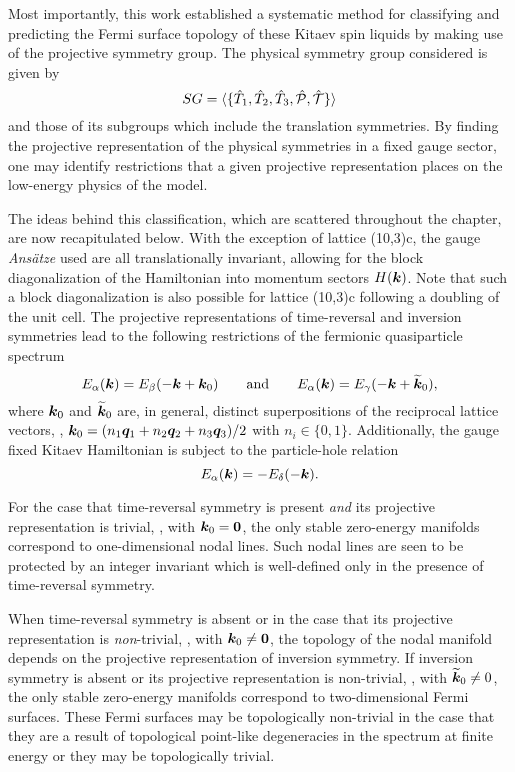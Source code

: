 Most importantly, this work established a systematic method for classifying and predicting the Fermi surface topology of these Kitaev spin liquids by making use of the projective symmetry group.
The physical symmetry group considered is given by
%
\begin{equation}
SG = \langle \{ \hat{T}_1, \hat{T}_2, \hat{T}_3, \hat{\mathcal{P}}, \hat{\mathcal{T}} \} \rangle
\end{equation}
%
and those of its subgroups which include the translation symmetries.
By finding the projective representation of the physical symmetries in a fixed gauge sector, one may identify restrictions that a given projective representation places on the low-energy physics of the model.

The ideas behind this classification, which are scattered throughout the chapter, are now recapitulated below.
With the exception of lattice (10,3)c, the gauge \textit{Ans\"atze} used are all translationally invariant, allowing for the block diagonalization of the Hamiltonian into momentum sectors $H(\bm{k})$.
Note that such a block diagonalization is also possible for lattice (10,3)c following a doubling of the unit cell.
The projective representations of time-reversal and inversion symmetries lead to the following restrictions of the fermionic quasiparticle spectrum
%
\begin{equation}
	E_{\alpha}(\bm{k}) = E_{\beta}(-\bm{k} + \bm{k}_0) \qquad {\rm and} \qquad E_{\alpha}(\bm{k}) = E_{\gamma}(-\bm{k} + \widetilde{\bm{k}}_0),
\end{equation}
%
where $\bm{k}_0$ and $\widetilde{\bm{k}}_0$ are, in general, distinct superpositions of the reciprocal lattice vectors, \eg, $\bm{k}_0 = (n_1 \bm{q}_1 + n_2 \bm{q}_2 + n_3 \bm{q}_3)/2$ with $n_i \in \{0, 1\}$.
Additionally, the gauge fixed Kitaev Hamiltonian is subject to the particle-hole relation
%
\begin{equation}
	E_{\alpha}(\bm{k}) = -E_{\delta}(-\bm{k}).
\end{equation}
%

For the case that time-reversal symmetry is present \textit{and} its projective representation is trivial, \ie, with $\bm{k}_0 = \bm{0}$, the only stable zero-energy manifolds correspond to one-dimensional nodal lines.
Such nodal lines are seen to be protected by an integer invariant which is well-defined only in the presence of time-reversal symmetry.

When time-reversal symmetry is absent or in the case that its projective representation is \textit{non}-trivial, \ie, with $\bm{k}_0 \neq \bm{0}$, the topology of the nodal manifold depends on the projective representation of inversion symmetry.
If inversion symmetry is absent or its projective representation is non-trivial, \ie, with $\widetilde{\bm{k}}_0 \neq 0$, the only stable zero-energy manifolds correspond to two-dimensional Fermi surfaces.
These Fermi surfaces may be topologically non-trivial in the case that they are a result of topological point-like degeneracies in the spectrum at finite energy or they may be topologically trivial.

